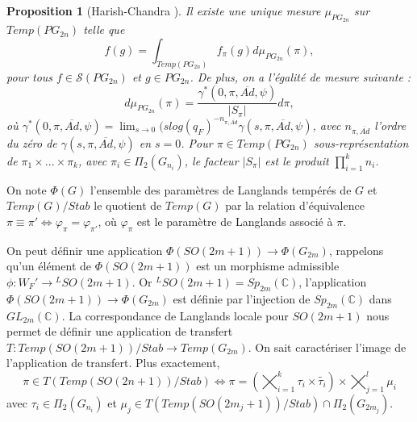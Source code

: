 \documentclass{amsart}
\newtheorem{proposition}{Proposition}[section]
\begin{document}
\begin{proposition}[Harish-Chandra \cite{waldspurger}]
Il existe une unique mesure $\mu_{PG_{2n}}$ sur $Temp(PG_{2n})$ telle que
\begin{equation}
f(g) = \int_{Temp(PG_{2n})} f_{\pi}(g) d\mu_{PG_{2n}}(\pi),
\end{equation} 
pour tous $f \in \mathcal{S}(PG_{2n})$ et $g \in PG_{2n}$. De plus, on a l'égalité de mesure suivante :
\begin{equation}
\label{mesurePlanch}
d\mu_{PG_{2n}}(\pi) = \frac{\gamma^*(0, \pi, \overline{Ad}, \psi)}{|S_\pi|} d\pi,
\end{equation}
où $\gamma^*(0, \pi, \overline{Ad}, \psi) = \lim_{s \rightarrow 0} (s log(q_F)^{-n_{\pi, \overline{Ad}}} \gamma(s, \pi, \overline{Ad}, \psi)$, avec $n_{\pi, \overline{Ad}}$ l'ordre du zéro de $\gamma(s, \pi, \overline{Ad}, \psi)$ en $s=0$. Pour $\pi \in Temp(PG_{2n})$ sous-représentation de $\pi_1 \times ... \times \pi_k$, avec $\pi_i \in \Pi_{2}(G_{n_i})$, le facteur $|S_{\pi}|$ est le produit $\prod_{i=1}^k n_i$.
\end{proposition}

On note $\Phi(G)$ l'ensemble des paramètres de Langlands tempérés de $G$ et $Temp(G)/Stab$ le quotient de $Temp(G)$ par la relation d'équivalence $\pi \equiv \pi' \iff \varphi_\pi = \varphi_{\pi'}$, où $\varphi_\pi$ est le paramètre de Langlands associé à $\pi$.

On peut définir une application $\Phi(SO(2m+1)) \rightarrow \Phi(G_{2m})$, rappelons qu'un élément de $\Phi(SO(2m+1))$ est un morphisme admissible $\phi : W_F' \rightarrow {}^L SO(2m+1)$. Or ${}^L SO(2m+1) = Sp_{2m}(\mathbb{C})$, l'application $\Phi(SO(2m+1)) \rightarrow \Phi(G_{2m})$ est définie par l'injection de $Sp_{2m}(\mathbb{C})$ dans $GL_{2m}(\mathbb{C})$. La correspondance de Langlands locale pour $SO(2m+1)$ nous permet de définir une application de transfert $T : Temp(SO(2m+1))/Stab \rightarrow Temp(G_{2m})$. On sait caractériser l'image de l'application de transfert. Plus exactement,
\begin{equation}
\label{caracTransf}
\pi \in T(Temp(SO(2n+1))/Stab) \iff \pi = \left( \bigtimes_{i=1}^k \tau_i \times \widetilde{\tau_i} \right) \times \bigtimes_{j=1}^l \mu_i
\end{equation}
avec $\tau_i \in \Pi_2(G_{n_i})$ et $\mu_j \in T(Temp(SO(2m_j+1))/Stab) \cap \Pi_2(G_{2m_j})$.
\end{document}
